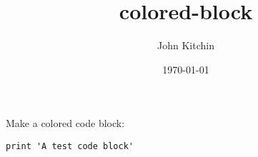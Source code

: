 \documentclass[11pt]{article}
\author{John Kitchin}
\date{\today}
\title{colored-block}
\begin{document}
\maketitle
\tableofcontents

Make a colored code block:

\begin{verbatim}
print 'A test code block'
\end{verbatim}
\end{document}
